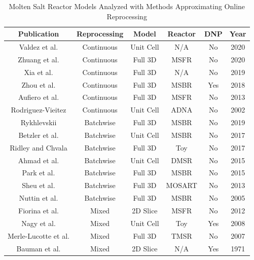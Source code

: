 \begin{table}[H]
\renewcommand{\arraystretch}{1.25}
\caption{Molten Salt Reactor Models Analyzed with Methods Approximating Online Reprocessing}
\label{tab:codes_types}
\begin{center}
\begin{tabular}{  c | c | c | c | c | c}
 \hline
 Publication & Reprocessing & Model & Reactor & DNP & Year\\
 \hline
 \hline
 Valdez et al. \cite{jr_vicente_valdez_modeling_2020} & Continuous & Unit Cell & N/A & No & 2020\\
 Zhuang et al. \cite{zhuang_extended_2020} & Continuous & Full 3D & MSFR & No & 2020\\
 Xia et al. \cite{xia_development_2019} & Continuous & Full 3D & N/A & No & 2019\\
 Zhou et al. \cite{zhou_fuel_2018} & Continuous & Full 3D & MSBR & Yes & 2018\\
 Aufiero et al. \cite{aufiero_extended_2013} & Continuous & Full 3D & MSFR & No & 2013\\
 Rodriguez-Vieitez \cite{rodriguez-vieitez_transmutation_2002} & Continuous & Unit Cell & ADNA & No & 2002\\
 \hline

 Rykhlevskii \cite{rykhlevskii_modeling_2019} & Batchwise & Full 3D & MSBR & No & 2019\\
 Betzler et al. \cite{betzler_molten_2017} & Batchwise & Unit Cell & MSBR & No & 2017\\
 Ridley and Chvala \cite{ridley_method_2017} & Batchwise & Full 3D & Toy & No & 2017\\
 Ahmad et al. \cite{ahmad_neutronics_2015} & Batchwise & Unit Cell & DMSR & No & 2015\\
 Park et al. \cite{park_whole_2015} & Batchwise & Full 3D & MSBR & No & 2015\\
 Sheu et al. \cite{sheu_depletion_2013} & Batchwise & Full 3D & MOSART & No & 2013\\
 Nuttin et al. \cite{nuttin_potential_2005} & Batchwise & Full 3D & MSBR & No & 2005\\

 \hline
 Fiorina et al. \cite{fiorina_preliminary_2012} & Mixed & 2D Slice & MSFR & No & 2012\\
 Nagy et al. \cite{nagy_parametric_2008} & Mixed & Unit Cell & Toy & Yes & 2008\\
 Merle-Lucotte et al. \cite{merle-lucotte_thorium_2007} & Mixed & Full 3D & TMSR & No & 2007\\
 Bauman et al. \cite{h_f_bauman_rod_1971} & Mixed & 2D Slice & N/A & Yes & 1971\\

 \hline
\end{tabular}
\end{center}
\end{table}

